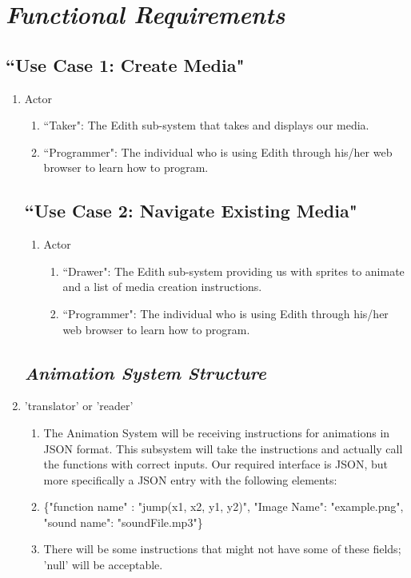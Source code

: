 \documentclass[12pt]{article}
\begin{document}
\section{\emph{Functional Requirements}}
	\subsection{``Use Case 1: Create Media"}
\begin{enumerate}
  \item Actor
  \begin{enumerate}
  		 \item ``Taker": The Edith sub-system that takes and displays our media.
       \item ``Programmer": The individual who is using Edith through his/her web browser to learn how to program.
  \end{enumerate}
  


  \subsection{``Use Case 2: Navigate Existing Media"}
\begin{enumerate}
  \item Actor
  \begin{enumerate}
      \item ``Drawer": The Edith sub-system providing us with sprites to animate and a list of media creation instructions.
      \item ``Programmer": The individual who is using Edith through his/her web browser to learn how to program.
  \end{enumerate}
  \end{enumerate}

\subsection{\emph{Animation System Structure}}%

\item 'translator' or 'reader'
\begin{enumerate}
\item The Animation System will be receiving instructions for animations in JSON format. This subsystem will take the instructions and actually call the functions with correct inputs. Our required interface is JSON, but more specifically a JSON entry with the following elements:
\item \{"function name" : "jump(x1, x2, y1, y2)", "Image Name": "example.png", "sound name": "soundFile.mp3"\}
\item There will be some instructions that might not have some of these fields; 'null' will be acceptable.


\end{enumerate}
\end{enumerate}
\end{document}
